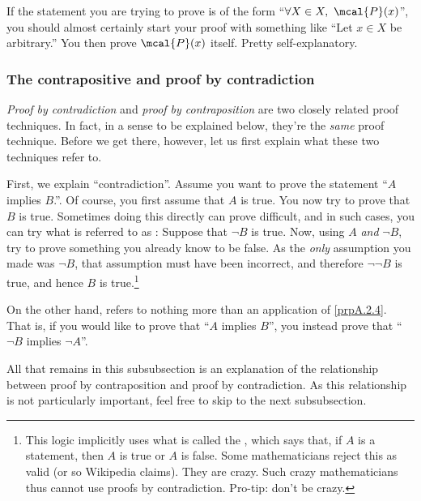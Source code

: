 If the statement you are trying to prove is of the form ``$\forall X\in X,\ \mcal{P}(x)$'', you should almost certainly start your proof with something like ``Let $x\in X$ be arbitrary.''  You then prove $\mcal{P}(x)$ itself.  Pretty self-explanatory.

\subsubsection{The contrapositive and proof by contradiction}

\emph{Proof by contradiction} and \emph{proof by contraposition} are two closely related proof techniques.  In fact, in a sense to be explained below, they're the \emph{same} proof technique.  Before we get there, however, let us first explain what these two techniques refer to.

First, we explain ``contradiction''.  Assume you want to prove the statement ``$A$ implies $B$.''.  Of course, you first assume that $A$ is true.  You now try to prove that $B$ is true.  Sometimes doing this directly can prove difficult, and in such cases, you can try what is referred to as :  Suppose that $\neg B$ is true.  Now, using $A$ \emph{and} $\neg B$, try to prove something you already know to be false.  As the \emph{only} assumption you made was $\neg B$, that assumption must have been incorrect, and therefore $\neg \neg B$ is true, and hence $B$ is true.\footnote{This logic implicitly uses what is called the , which says that, if $A$ is a statement, then $A$ is true or $A$ is false.  Some mathematicians reject this as valid (or so Wikipedia claims).  They are crazy.  Such crazy mathematicians thus cannot use proofs by contradiction.  Pro-tip:  don't be crazy.}

On the other hand,  refers to nothing more than an application of \cref{prpA.2.4}.  That is, if you would like to prove that ``$A$ implies $B$'', you instead prove that ``$\neg B$ implies $\neg A$''.

All that remains in this subsubsection is an explanation of the relationship between proof by contraposition and proof by contradiction.  As this relationship is not particularly important, feel free to skip to the next subsubsection.

